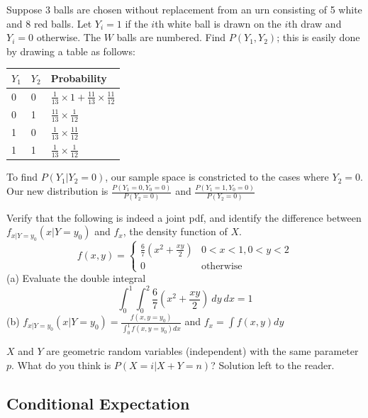 \documentclass[11pt]{article}
\theoremstyle{definition}
\begin{document}
\example Suppose 3 balls are chosen without replacement from an urn consisting of 5 white and 8 red balls. Let $Y_i = 1$ if the $i$th white ball is drawn on the $i$th draw and $Y_i = 0$ otherwise. The $W$ balls are numbered. Find $P(Y_1, Y_2)$; this is easily done by drawing a table as follows:

\begin{table}[h]
\centering
\begin{tabular}{@{}lll@{}}
\toprule
$Y_1$ & $Y_2$ & Probability                                                  \\ \midrule
0     & 0     & $\frac{1}{13} \times 1 + \frac{11}{13} \times \frac{11}{12}$ \\
0     & 1     & $\frac{11}{13} \times \frac{1}{12}$                          \\
1     & 0     & $\frac{1}{13} \times \frac{11}{12}$                          \\
1     & 1     & $\frac{1}{13} \times \frac{1}{12}$                           \\ \bottomrule
\end{tabular}
\end{table}

\noindent To find $P(Y_1 | Y_2 = 0)$, our sample space is constricted to the cases where $Y_2 = 0$. Our new distribution is $\frac{P(Y_1 = 0, Y_0 = 0)}{P(Y_2 = 0)}$ and $\frac{P(Y_1 = 1, Y_0 = 0)}{P(Y_2 = 0)}$ 

\example Verify that the following is indeed a joint pdf, and identify the difference between $f_{x|Y=y_0}(x|Y=y_0)$ and $f_x$, the density function of $X$.  \begin{equation*}
f(x,y) = \begin{cases}
\frac{6}{7} (x^2 + \frac{xy}{2}) & 0 < x < 1, 0 < y < 2\\
0 & \text{otherwise}
\end{cases}
\end{equation*}
(a) Evaluate the double integral $$\int_0^1 \int_0^2 \frac{6}{7} \left(x^2 + \frac{xy}{2}\right) \: dy \: dx = 1$$(b) $f_{x|Y=y_0}(x|Y=y_0) = \frac{f(x, y=y_0)}{\int_0^1 f(x, y=y_0) dx}$ and $f_x = \int f(x, y) dy$

\example $X$ and $Y$ are geometric random variables (independent) with the same parameter $p$. What do you think is $P(X = i | X + Y = n)$? Solution left to the reader. 

\subsection{Conditional Expectation} 
\end{document}
